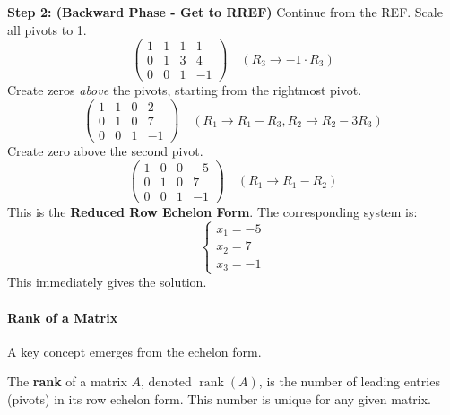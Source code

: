 \textbf{Step 2: (Backward Phase - Get to RREF)}
Continue from the REF. Scale all pivots to 1.
\[
\left(\begin{array}{ccc|c}
1 & 1 & 1 & 1 \\
0 & 1 & 3 & 4 \\
0 & 0 & 1 & -1
\end{array}\right) \quad (R_3 \to -1 \cdot R_3)
\]
Create zeros \emph{above} the pivots, starting from the rightmost pivot.
\[
\left(\begin{array}{ccc|c}
1 & 1 & 0 & 2 \\
0 & 1 & 0 & 7 \\
0 & 0 & 1 & -1
\end{array}\right) \quad (R_1 \to R_1 - R_3, R_2 \to R_2 - 3R_3)
\]
Create zero above the second pivot.
\[
\left(\begin{array}{ccc|c}
1 & 0 & 0 & -5 \\
0 & 1 & 0 & 7 \\
0 & 0 & 1 & -1
\end{array}\right) \quad (R_1 \to R_1 - R_2)
\]
This is the \textbf{Reduced Row Echelon Form}. The corresponding system is:
\[
\begin{cases}
x_1 = -5 \\
x_2 = 7 \\
x_3 = -1
\end{cases}
\]
This immediately gives the solution.

\newpage

\paragraph{Rank of a Matrix}
A key concept emerges from the echelon form.

\begin{definition}
The \textbf{rank} of a matrix $A$, denoted $\operatorname{rank}(A)$, is the number of leading entries (pivots) in its row echelon form. This number is unique for any given matrix.
\end{definition}


